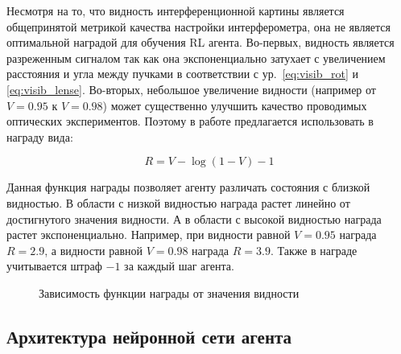 Несмотря на то, что видность интерференционной картины является общепринятой метрикой качества настройки интерферометра, она не является оптимальной наградой для обучения RL агента. Во-первых, видность является разреженным сигналом так как она экспоненциально затухает с увеличением расстояния и угла между пучками в соответствии с ур.~\eqref{eq:visib_rot} и \eqref{eq:visib_lense}. Во-вторых, небольшое увеличение видности (например от $V = 0.95$ к $V = 0.98$) может существенно улучшить качество проводимых оптических экспериментов. Поэтому в работе предлагается использовать в награду вида:

\begin{equation}
    R = V - \log(1-V) - 1
\label{eq:dqn_reward}
\end{equation}

Данная функция награды позволяет агенту различать состояния с близкой видностью. В области с низкой видностью награда растет линейно от достигнутого значения видности. А в области с высокой видностью награда растет экспоненциально. Например, при видности равной $V = 0.95$ награда $R = 2.9$, а видности равной $V = 0.98$ награда $R = 3.9$. Также в награде учитывается штраф $-1$ за каждый шаг агента. 

\begin{figure}[ht]
\caption{Зависимость функции награды от значения видности}
\label{fig:reward_visib}
\end{figure}

\subsection{Архитектура нейронной сети агента}

